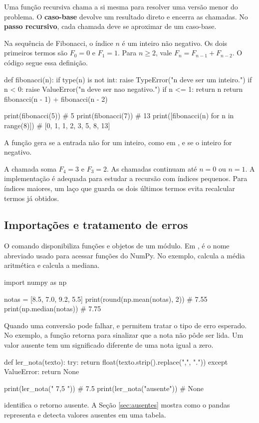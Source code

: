 Uma função recursiva chama a si mesma para resolver uma versão menor do problema. O \textbf{caso-base} devolve um resultado direto e encerra as chamadas. No \textbf{passo recursivo}, cada chamada deve se aproximar de um caso-base.

Na sequência de Fibonacci, o índice \(n\) é um inteiro não negativo. Os dois primeiros termos são \(F_0=0\) e \(F_1=1\). Para \(n\ge 2\), vale \(F_n=F_{n-1}+F_{n-2}\). O código segue essa definição.

\begin{exemplo}
def fibonacci(n):
    if type(n) is not int:
        raise TypeError("n deve ser um inteiro.")
    if n < 0:
        raise ValueError("n deve ser nao negativo.")
    if n <= 1:
        return n
    return fibonacci(n - 1) + fibonacci(n - 2)

print(fibonacci(5))  # 5
print(fibonacci(7))  # 13
print([fibonacci(n) for n in range(8)])
# [0, 1, 1, 2, 3, 5, 8, 13]
\end{exemplo}

A função gera  se a entrada não for um inteiro, como em , e  se o inteiro for negativo.

A chamada  soma \(F_4=3\) e \(F_3=2\). As chamadas continuam até \(n=0\) ou \(n=1\). A implementação é adequada para estudar a recursão com índices pequenos. Para índices maiores, um laço que guarda os dois últimos termos evita recalcular termos já obtidos.

\subsection{Importações e tratamento de erros}

O comando  disponibiliza funções e objetos de um módulo. Em ,  é o nome abreviado usado para acessar funções do NumPy. No exemplo,  calcula a média aritmética e  calcula a mediana.

\begin{exemplo}
import numpy as np

notas = [8.5, 7.0, 9.2, 5.5]
print(round(np.mean(notas), 2))  # 7.55
print(np.median(notas))          # 7.75
\end{exemplo}

Quando uma conversão pode falhar,  e  permitem tratar o tipo de erro esperado. No exemplo, a função retorna  para sinalizar que a nota não pôde ser lida. Um valor ausente tem um significado diferente de uma nota igual a zero.

\begin{exemplo}
def ler_nota(texto):
    try:
        return float(texto.strip().replace(",", "."))
    except ValueError:
        return None

print(ler_nota(" 7,5 "))  # 7.5
print(ler_nota("ausente"))  # None
\end{exemplo}

 identifica o retorno ausente. A Seção \ref{sec:ausentes} mostra como o pandas representa e detecta valores ausentes em uma tabela.

